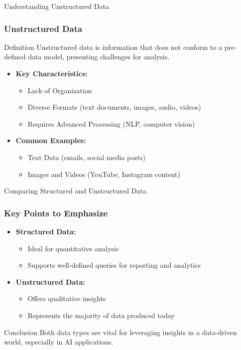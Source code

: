 \documentclass[aspectratio=169]{beamer}
\begin{document}
\begin{frame}[fragile]{Understanding Unstructured Data}
  \frametitle{Unstructured Data}
  
  \begin{block}{Definition}
    Unstructured data is information that does not conform to a pre-defined data model, presenting challenges for analysis.
  \end{block}
  
  \begin{itemize}
    \item \textbf{Key Characteristics:}
    \begin{itemize}
      \item Lack of Organization
      \item Diverse Formats (text documents, images, audio, videos)
      \item Requires Advanced Processing (NLP, computer vision)
    \end{itemize}
    
    \item \textbf{Common Examples:}
    \begin{itemize}
      \item Text Data (emails, social media posts)
      \item Images and Videos (YouTube, Instagram content)
    \end{itemize}
  \end{itemize}
\end{frame}

\begin{frame}[fragile]{Comparing Structured and Unstructured Data}
  \frametitle{Key Points to Emphasize}
  
  \begin{itemize}
    \item \textbf{Structured Data:}
    \begin{itemize}
      \item Ideal for quantitative analysis
      \item Supports well-defined queries for reporting and analytics
    \end{itemize}
    
    \item \textbf{Unstructured Data:}
    \begin{itemize}
      \item Offers qualitative insights
      \item Represents the majority of data produced today
    \end{itemize}
  \end{itemize}
  
  \begin{block}{Conclusion}
    Both data types are vital for leveraging insights in a data-driven world, especially in AI applications.
  \end{block}
\end{frame}
\end{document}
